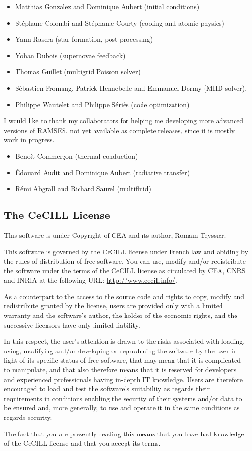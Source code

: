 \begin{itemize}
   \item Matthias Gonzalez and Dominique Aubert (initial conditions)
   \item St\'ephane Colombi and St\'ephanie Courty (cooling and atomic
physics)
   \item Yann Rasera (star formation, post-processing)
   \item Yohan Dubois (supernovae feedback)
   \item Thomas Guillet (multigrid Poisson solver)
   \item S\'ebastien Fromang, Patrick Hennebelle and Emmanuel Dormy (MHD
solver).
   \item Philippe Wautelet and Philippe S\'eri\`es (code optimization)
\end{itemize}

I would like to thank my collaborators for helping me developing more
advanced versions of RAMSES, not yet available as complete releases,
since it is mostly work in progress.

\begin{itemize}
   \item Beno\^it Commer\c{c}on (thermal conduction)
   \item \'Edouard Audit and Dominique Aubert (radiative transfer)
   \item R\'emi Abgrall and Richard Saurel (multifluid)
\end{itemize}

\subsection{The CeCILL License}
\label{sec:cecill}

This software is under Copyright of CEA and its author, Romain Teyssier.

This software is governed by the CeCILL license under French law and
abiding by the rules of distribution of free software. You can use,
modify and/or redistribute the software under the terms of the CeCILL
license as circulated by CEA, CNRS and INRIA at the following URL:
\url{http://www.cecill.info/}.

As a counterpart to the access to the source code and rights to copy,
modify and redistribute granted by the license, users are provided only
with a limited warranty and the software's author, the holder of the
economic rights, and the successive licensors have only limited
liability.

In this respect, the user's attention is drawn to the risks associated
with loading, using, modifying and/or developing or reproducing the
software by the user in light of its specific status of free software,
that may mean that it is complicated to manipulate, and that also
therefore means that it is reserved for developers and experienced
professionals having in-depth IT knowledge. Users are therefore
encouraged to load and test the software's suitability as regards their
requirements in conditions enabling the security of their systems and/or
data to be ensured and, more generally, to use and operate it in the
same conditions as regards security.

The fact that you are presently reading this means that you have had
knowledge of the CeCILL license and that you accept its terms.

